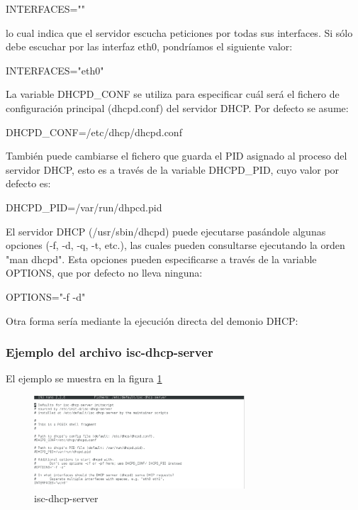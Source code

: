 	\begin{listing}[style=texto, numbers=none]
	INTERFACES=""
 	\end{listing}

lo cual indica que el servidor escucha peticiones por todas sus interfaces. Si sólo debe escuchar por las interfaz eth0, pondríamos el siguiente valor:
	\begin{listing}[style=texto, numbers=none]
	INTERFACES="eth0"
 	\end{listing}
 	
La variable DHCPD\_CONF se utiliza para especificar cuál será el fichero de configuración principal (dhcpd.conf) del servidor DHCP. Por defecto se asume:
 	\begin{listing}[style=texto, numbers=none]
	DHCPD_CONF=/etc/dhcp/dhcpd.conf
 	\end{listing}
 	
 	También puede cambiarse el fichero que guarda el PID asignado al proceso del servidor DHCP, esto es a través de la variable DHCPD\_PID, cuyo valor por defecto es:
 	
  \begin{listing}[style=texto, numbers=none]
   DHCPD_PID=/var/run/dhpcd.pid
  \end{listing}
 	
 	El servidor DHCP (/usr/sbin/dhcpd) puede ejecutarse pasándole algunas opciones (-f, -d, -q, -t, etc.), las cuales pueden consultarse ejecutando la orden "man dhcpd". Esta opciones pueden especificarse a través de la variable OPTIONS, que por defecto no lleva ninguna:
  
  \begin{listing}[style=texto, numbers=none]
	OPTIONS="-f -d"
 	\end{listing}

Otra forma sería mediante la ejecución directa del demonio DHCP:
 	
 	\begin{listing}[style=consola, numbers=none]
	$/usr/sbin/dhcpd -f -d
 	\end{listing}
 	\subsubsection{Ejemplo del archivo isc-dhcp-server}
 	El ejemplo se muestra en la figura \ref{fig:1}
 	\begin{figure}
  \centering
    \includegraphics[width=0.7\textwidth]{img/isc-dhcp}
  \caption{isc-dhcp-server}
  \label{fig:1}
\end{figure}
 	
